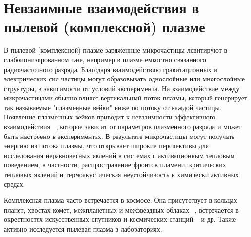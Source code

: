 \section{Невзаимные взаимодействия в пылевой (комплексной) плазме}

В пылевой (комплексной) плазме заряженные микрочастицы левитируют в слабоионизированном газе, например в плазме емкостно связанного радиочастотного разряда. Благодаря взаимодействию гравитационных и электрических сил частицы могут образовывать однослойные или многослойные структуры, в зависимости от условий эксперимента. На взаимодействие между микрочастицами обычно влияет вертикальный поток плазмы, который генерирует так называемые "плазменные вейки" ниже по потоку от каждой частицы. 
Появление плазменных вейков приводит к невзаимности эффективного взаимодействия ~\cite{QYeandFLu}, которое зависит от параметров плазменного разряда и может быть настроено в экспериментах. В результате микрочастицы могут получать энергию из потока плазмы, что открывает широкие перспективы для исследования неравновесных явлений в системах с активационным тепловым поведением, в частности, распространение фронтов пламени,  критических тепловых явлений и термоакустическая неустойчивость в химически активных средах.

Комплексная плазма часто встречается в
космосе. Она присутствует в кольцах планет, хвостах комет, межпланетных
и межзвездных облаках ~\cite{doi:10.1029/RG027i002p00271, Tsytovich_1997}, встречается в окрестностях искусственных
спутников и космических станций ~\cite{Whipple_1981} и др. Также активно исследуется пылевая
плазма в лабораториях.


